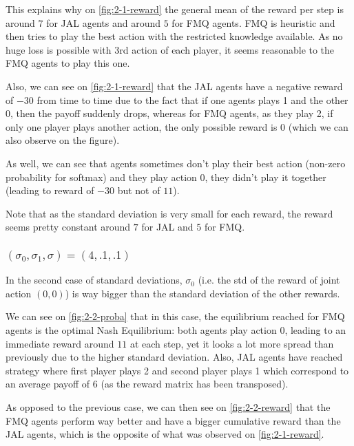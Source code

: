 \documentclass{article}
\begin{document}
This explains why on \autoref{fig:2-1-reward} the general mean of the reward per step is around $7$ for JAL agents and around $5$
for FMQ agents. FMQ is heuristic and then tries to play the best action with the restricted knowledge available. As no huge loss
is possible with 3rd action of each player, it seems reasonable to the FMQ agents to play this one.

Also, we can see on \autoref{fig:2-1-reward} that the JAL agents have a negative reward of $-30$ from time to time due to
the fact that if one agents plays 1 and the other 0, then the payoff suddenly drops, whereas for FMQ agents, as they play 2,
if only one player plays another action, the only possible reward is 0 (which we can also observe on the figure).

As well, we can see that agents sometimes don't play their best action (non-zero probability for softmax) and they play action 0,
they didn't play it together (leading to reward of $-30$ but not of $11$).

Note that as the standard deviation is very small for each reward, the reward seems pretty constant around $7$ for JAL and $5$ for FMQ.

\subsubsection{$(\sigma_0, \sigma_1, \sigma) = (4, .1, .1)$}

In the second case of standard deviations, $\sigma_0$ (i.e. the std of the reward of joint action $(0, 0)$) is way bigger than the
standard deviation of the other rewards.

We can see on \autoref{fig:2-2-proba} that in this case, the equilibrium reached for FMQ agents is the optimal Nash Equilibrium:
both agents play action 0, leading to an immediate reward around $11$ at each step, yet it looks a lot more spread than previously
due to the higher standard deviation. Also, JAL agents have reached strategy where first player plays 2 and second player plays 1
which correspond to an average payoff of $6$ (as the reward matrix has been transposed).

As opposed to the previous case, we can then see on \autoref{fig:2-2-reward} that the FMQ agents perform way better and have a bigger
cumulative reward than the JAL agents, which is the opposite of what was observed on \autoref{fig:2-1-reward}.
\end{document}
